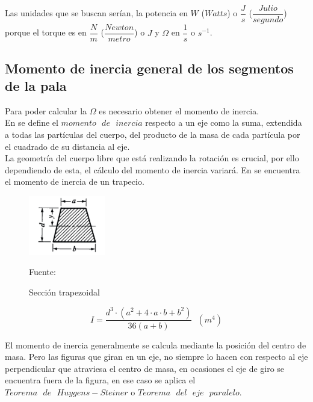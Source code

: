 Las unidades que se buscan serían, la potencia en $W$ ($Watts$) o $\dfrac{J}{s}$ ($\dfrac{Julio}{segundo}$) porque el torque es en $\dfrac{N}{m}$ ($\dfrac{Newton}{metro}$) o $J$ y $\Omega$ en $\dfrac{1}{s}$ o $s^{-1}$.

 
\subsection{Momento de inercia general de los segmentos de la pala}

Para poder calcular la $\Omega$ es necesario obtener el momento de inercia.\\

En \cite[p.~269]{goldstein1987mecanica} se define el $momento \text{ } de \text{ } inercia$ respecto a un eje como la suma, extendida a todas las partículas del cuerpo, del producto de la masa de cada partícula por el cuadrado de su distancia al eje.\\


La geometría del cuerpo libre que está realizando la rotación es crucial, por ello dependiendo de esta, el cálculo del momento de inercia variará. En \cite[p.~242]{oberg2012machinery} se encuentra el momento de inercia de un trapecio. \\


\begin{figure}[H]
    \centering
    \includegraphics[width=0.3\textwidth]{images/trapecio libro machinery.png}
    \caption{Sección trapezoidal}
    Fuente: \cite[p.~242]{oberg2012machinery}
    \label{fig:momento_inercia_libro}
\end{figure}



\begin{equation}
    I = \dfrac{ d^3 \cdot (a^2 + 4 \cdot a \cdot b + b^2)}{ 36 (a + b)} \hspace{7pt} (m^4) 
\end{equation}




El momento de inercia generalmente se calcula mediante la posición del centro de masa. Pero las figuras que giran en un eje, no siempre lo hacen con respecto al eje perpendicular que atraviesa el centro de masa, en ocasiones el eje de giro se encuentra fuera de la figura, en ese caso se aplica el $Teorema \text{ } de \text{ } Huygens-Steiner$ o $Teorema \text{ } del \text{ } eje \text{ } paralelo$. \\

